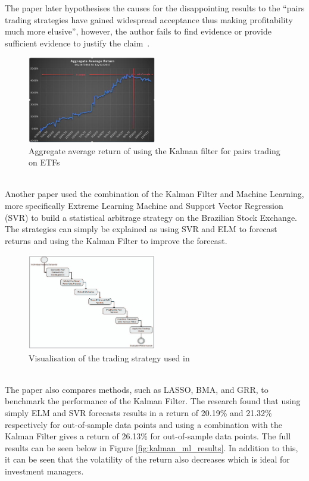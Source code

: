 \noindent The paper later hypothesises the causes for the disappointing results to the ``pairs trading strategies have gained widespread acceptance thus making profitability much more elusive'', however, the author fails to find evidence or provide sufficient evidence to justify the claim~\cite{dempsey_market_2017}.
\begin{figure}[htb!]
    \centering
    \includegraphics[width=0.5\textwidth]{background/Images/insamplevsoutsampleresults.png}
    \caption{Aggregate average return of using the Kalman filter for pairs trading on ETFs~\cite{dempsey_market_2017}}
    \label{fig:kalman_results}
\end{figure}
\\[5mm]
Another paper used the combination of the Kalman Filter and Machine Learning, more specifically Extreme Learning Machine and Support Vector Regression (SVR) to build a statistical arbitrage strategy on the Brazilian Stock Exchange. The strategies can simply be explained as using SVR and ELM to forecast returns and using the Kalman Filter to improve the forecast.
\begin{figure}[htb!]
    \centering
    \includegraphics[width=0.5\textwidth]{background/Images/KalmanMLFlowChart.png}
    \caption{Visualisation of the trading strategy used in \cite{6974093}}
    \label{fig:kalman_ml_flowchart}
\end{figure}
\\[5mm]
The paper also compares methods, such as LASSO, BMA, and GRR, to benchmark the performance of the Kalman Filter. The research found that using simply ELM and SVR forecasts results in a return of 20.19\% and 21.32\% respectively for out-of-sample data points and using a combination with the Kalman Filter gives a return of 26.13\% for out-of-sample data points. The full results can be seen below in Figure \ref{fig:kalman_ml_results}. In addition to this, it can be seen that the volatility of the return also decreases which is ideal for investment managers.
